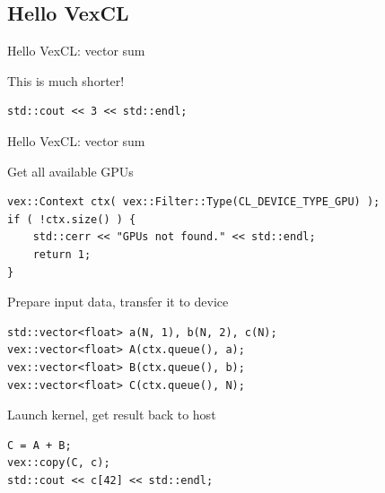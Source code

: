 \documentclass[@BEAMER_OPTIONS@]{beamer}
\begin{document}

\subsection{Hello VexCL}

\begin{frame}[fragile]{Hello VexCL: vector sum}
    \begin{exampleblock}{This is much shorter!}
        \begin{lstlisting}
std::cout << 3 << std::endl;
        \end{lstlisting}
    \end{exampleblock}
\end{frame}

\note[itemize]{
\item $\ddot\smile$
}

\begin{frame}[fragile]{Hello VexCL: vector sum}
    \begin{exampleblock}{Get all available GPUs}
        \begin{lstlisting}
vex::Context ctx( vex::Filter::Type(CL_DEVICE_TYPE_GPU) );
if ( !ctx.size() ) {
    std::cerr << "GPUs not found." << std::endl;
    return 1;
}
        \end{lstlisting}
    \end{exampleblock}
    \begin{exampleblock}{Prepare input data, transfer it to device}
        \begin{lstlisting}[firstnumber=last]
std::vector<float> a(N, 1), b(N, 2), c(N);
vex::vector<float> A(ctx.queue(), a);
vex::vector<float> B(ctx.queue(), b);
vex::vector<float> C(ctx.queue(), N);
        \end{lstlisting}
    \end{exampleblock}
    \begin{exampleblock}{Launch kernel, get result back to host}
        \begin{lstlisting}[firstnumber=last]
C = A + B;
vex::copy(C, c);
std::cout << c[42] << std::endl;
        \end{lstlisting}
    \end{exampleblock}
\end{frame}
\end{document}
